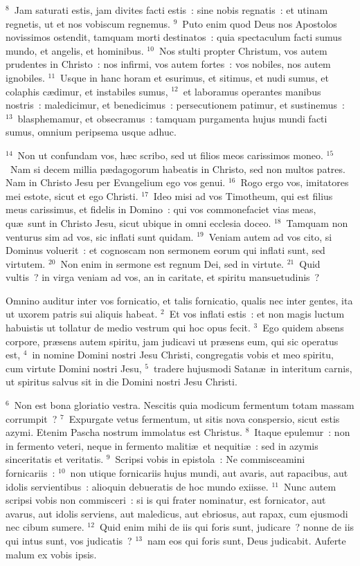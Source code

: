 ${}^{8}$~Jam saturati estis, jam divites facti estis~: sine nobis regnatis~: et utinam regnetis, ut et nos vobiscum regnemus.
${}^{9}$~Puto enim quod Deus nos Apostolos novissimos ostendit, tamquam morti destinatos~: quia spectaculum facti sumus mundo, et angelis, et hominibus.
${}^{10}$~Nos stulti propter Christum, vos autem prudentes in Christo~: nos infirmi, vos autem fortes~: vos nobiles, nos autem ignobiles.
${}^{11}$~Usque in hanc horam et esurimus, et sitimus, et nudi sumus, et colaphis c\ae dimur, et instabiles sumus,
${}^{12}$~et laboramus operantes manibus nostris~: maledicimur, et benedicimus~: persecutionem patimur, et sustinemus~:
${}^{13}$~blasphemamur, et obsecramus~: tamquam purgamenta hujus mundi facti sumus, omnium peripsema usque adhuc.


${}^{14}$~Non ut confundam vos, h\ae c scribo, sed ut filios meos carissimos moneo.
${}^{15}$~Nam si decem millia p\ae dagogorum habeatis in Christo, sed non multos patres. Nam in Christo Jesu per Evangelium ego vos genui.
${}^{16}$~Rogo ergo vos, imitatores mei estote, sicut et ego Christi.
${}^{17}$~Ideo misi ad vos Timotheum, qui est filius meus carissimus, et fidelis in Domino~: qui vos commonefaciet vias meas, qu\ae\ sunt in Christo Jesu, sicut ubique in omni ecclesia doceo.
${}^{18}$~Tamquam non venturus sim ad vos, sic inflati sunt quidam.
${}^{19}$~Veniam autem ad vos cito, si Dominus voluerit~: et cognoscam non sermonem eorum qui inflati sunt, sed virtutem.
${}^{20}$~Non enim in sermone est regnum Dei, sed in virtute.
${}^{21}$~Quid vultis~? in virga veniam ad vos, an in caritate, et spiritu mansuetudinis~?

\lettrine[lines=10,image=true,loversize=0.05,lraise=-0.03]{O}{}mnino auditur inter vos fornicatio, et talis fornicatio, qualis nec inter gentes, ita ut uxorem patris sui aliquis habeat.
${}^{2}$~Et vos inflati estis~: et non magis luctum habuistis ut tollatur de medio vestrum qui hoc opus fecit.
${}^{3}$~Ego quidem absens corpore, pr\ae sens autem spiritu, jam judicavi ut pr\ae sens eum, qui sic operatus est,
${}^{4}$~in nomine Domini nostri Jesu Christi, congregatis vobis et meo spiritu, cum virtute Domini nostri Jesu,
${}^{5}$~tradere hujusmodi Satan\ae\ in interitum carnis, ut spiritus salvus sit in die Domini nostri Jesu Christi.


${}^{6}$~Non est bona gloriatio vestra. Nescitis quia modicum fermentum totam massam corrumpit~?
${}^{7}$~Expurgate vetus fermentum, ut sitis nova conspersio, sicut estis azymi. Etenim Pascha nostrum immolatus est Christus.
${}^{8}$~Itaque epulemur~: non in fermento veteri, neque in fermento maliti\ae\ et nequiti\ae~: sed in azymis sinceritatis et veritatis.
${}^{9}$~Scripsi vobis in epistola~: Ne commisceamini fornicariis~:
${}^{10}$~non utique fornicariis hujus mundi, aut avaris, aut rapacibus, aut idolis servientibus~: alioquin debueratis de hoc mundo exiisse.
${}^{11}$~Nunc autem scripsi vobis non commisceri~: si is qui frater nominatur, est fornicator, aut avarus, aut idolis serviens, aut maledicus, aut ebriosus, aut rapax, cum ejusmodi nec cibum sumere.
${}^{12}$~Quid enim mihi de iis qui foris sunt, judicare~? nonne de iis qui intus sunt, vos judicatis~?
${}^{13}$~nam eos qui foris sunt, Deus judicabit. Auferte malum ex vobis ipsis.

